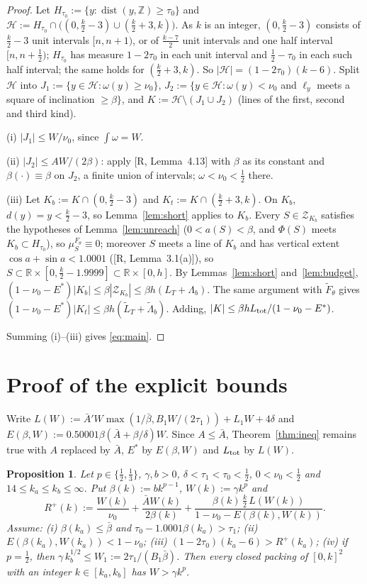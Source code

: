 \documentclass[11pt]{amsart}
\newcommand{\R}{\mathbb R}
\newcommand{\Z}{\mathbb Z}
\newcommand{\cZ}{\mathcal Z}
\newcommand{\cH}{\mathcal H}
\newcommand{\dist}{\operatorname{dist}}
\newcommand{\bbar}{\bar\beta}
\newcommand{\Abar}{\bar A}
\newcommand{\Lam}{\Lambda}
\newtheorem{proposition}[theorem]{Proposition}
\theoremstyle{definition}
\theoremstyle{remark}
\numberwithin{equation}{section}
\begin{document}
\begin{proof}
Let $H_{\tau_0}:=\{y:\dist(y,\Z)\ge\tau_0\}$ and $\cH:=H_{\tau_0}\cap\big((0,\frac k2-3)\cup(\frac k2+3,k)\big)$. As $k$ is
an integer, $(0,\frac k2-3)$ consists of $\frac k2-3$ unit intervals $[n,n+1)$, or of $\frac{k-7}2$ unit intervals and
one half interval $[n,n+\frac12)$; $H_{\tau_0}$ has measure $1-2\tau_0$ in each unit interval and $\frac12-\tau_0$ in each such half
interval; the same holds for $(\frac k2+3,k)$. So $|\cH|=(1-2\tau_0)(k-6)$. Split $\cH$ into
$J_1:=\{y\in\cH:\omega(y)\ge\nu_0\}$, $J_2:=\{y\in\cH:\omega(y)<\nu_0$ and $\ell_y$ meets a square of inclination
$\ge\beta\}$, and $K:=\cH\setminus(J_1\cup J_2)$ (lines of the first, second and third kind).

(i) $|J_1|\le W/\nu_0$, since $\int\omega=W$.

(ii) $|J_2|\le AW/(2\beta)$: apply [R, Lemma~4.13] with $\beta$ as its constant and $\beta(\cdot)\equiv\beta$ on $J_2$, a
finite union of intervals; $\omega<\nu_0<\frac12$ there.

(iii) Let $K_b:=K\cap(0,\frac k2-3)$ and $K_t:=K\cap(\frac k2+3,k)$. On $K_b$, $d(y)=y<\frac k2-3$, so
Lemma~\ref{lem:short} applies to $K_b$. Every $S\in\cZ_{K_b}$ satisfies the hypotheses of Lemma~\ref{lem:unreach}
($0<a(S)<\beta$, and $\Phi(S)$ meets $K_b\subset H_{\tau_0}$), so $\mu_S^{F_\theta}\equiv0$; moreover $S$ meets a line of
$K_b$ and has vertical extent $\cos a+\sin a<1.0001$ ([R, Lemma~3.1(a)]), so
$S\subset\R\times[0,\frac k2-1.9999]\subset\R\times[0,h]$. By
Lemmas~\ref{lem:short} and~\ref{lem:budget}, $(1-\nu_0-E^*)|K_b|\le\beta|\cZ_{K_b}|\le\beta h(L_T+\Lam_b)$. The same
argument with $\tilde F_\theta$ gives $(1-\nu_0-E^*)|K_t|\le\beta h(\tilde L_T+\tilde\Lam_b)$. Adding,
$|K|\le\beta hL_{\rm tot}/(1-\nu_0-E^*)$.

Summing (i)--(iii) gives \eqref{eq:main}.
\end{proof}

\section{Proof of the explicit bounds}\label{sec:explicit}

Write $L(W):=\bar A'W\max(1/\bbar,B_1W/(2\tau_1))+L_1W+4\delta$ and $E(\beta,W):=0.50001\beta(\Abar+\beta/\delta)W$. Since
$A\le\Abar$, Theorem~\ref{thm:ineq} remains true with $A$ replaced by $\Abar$, $E^*$ by $E(\beta,W)$ and $L_{\rm tot}$ by
$L(W)$.

\begin{proposition}\label{prop:reduce}
Let $p\in\{\frac12,\frac13\}$, $\gamma,b>0$, $\delta<\tau_1<\tau_0<\frac12$, $0<\nu_0<\frac12$ and
$14\le k_a\le k_b\le\infty$. Put $\beta(k):=bk^{p-1}$, $W(k):=\gamma k^p$ and
\[
R^+(k):=\frac{W(k)}{\nu_0}+\frac{\Abar W(k)}{2\beta(k)}+\frac{\beta(k)\,\frac k2\,L(W(k))}{1-\nu_0-E(\beta(k),W(k))}.
\]
Assume: \textup{(i)} $\beta(k_a)\le\bbar$ and $\tau_0-1.0001\beta(k_a)>\tau_1$; \textup{(ii)}
$E(\beta(k_a),W(k_a))<1-\nu_0$; \textup{(iii)} $(1-2\tau_0)(k_a-6)>R^+(k_a)$; \textup{(iv)} if $p=\frac12$, then
$\gamma\,k_b^{1/2}\le W_1:=2\tau_1/(B_1\bbar)$. Then every closed packing of $[0,k]^2$ with an integer $k\in[k_a,k_b]$
has $W>\gamma k^p$.
\end{proposition}
\end{document}
